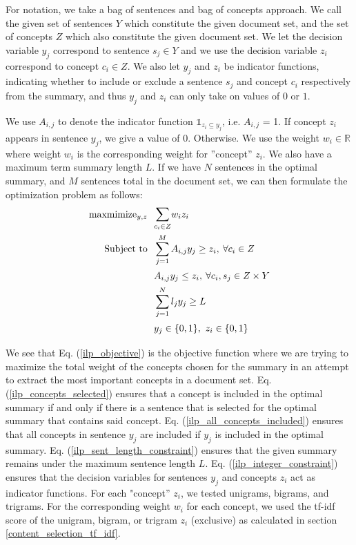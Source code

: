 For notation, we take a bag of sentences and bag of concepts approach. We call the given set of sentences $Y$ which constitute the given document set, and the set of concepts $Z$ which also constitute the given document set. We let the decision variable $y_j$ correspond to sentence $s_j\in Y$ and we use the decision variable $z_i$ correspond to concept $c_i\in Z$. We also let $y_j$ and $z_i$ be indicator functions, indicating whether to include or exclude a sentence $s_j$ and concept $c_i$ respectively from the summary, and thus $y_j$ and $z_i$ can only take on values of $0$ or $1$. 

We use $A_{i,j}$ to denote the indicator function $\mathds{1}_{z_i\subseteq y_j}$, i.e. $A_{i,j}$ = 1. If concept $z_i$ appears in sentence $y_j$, we give a value of 0. Otherwise. We use the weight $w_i\in\mathbb R$ where weight $w_i$ is the corresponding weight for ''concept'' $z_i$. We also have a maximum term summary length $L$. If we have $N$ sentences in the optimal summary, and $M$ sentences total in the document set, we can then formulate the optimization problem as follows:
\begin{align}
    \text{maxmimize}_{y,z} \ \ &\mathlarger\sum_{c_i\in Z} w_iz_i \label{ilp_objective} \\
    \text{Subject to} \ \ & \sum_{j=1}^M A_{i,j} y_j \geq z_i,\:\forall c_i\in Z  
    \label{ilp_concepts_selected} \\
    & A_{i,j}y_j \leq z_i, \: \forall c_i, s_j\in Z\times Y\label{ilp_all_concepts_included} \\
    & \sum_{j=1}^N l_jy_j \geq L \label{ilp_sent_length_constraint} \\
    & y_j\in \{0, 1\}, \ z_i\in \{0, 1\} \label{ilp_integer_constraint}
\end{align}

We see that Eq. (\ref{ilp_objective}) is the objective function where we are trying to maximize the total weight of the concepts chosen for the summary in an attempt to extract the most important concepts in a document set. 
Eq. (\ref{ilp_concepts_selected}) ensures that a concept is included in the optimal summary if and only if there is a sentence that is selected for the optimal summary that contains said concept.
Eq. (\ref{ilp_all_concepts_included}) ensures that all concepts in sentence $y_j$ are included if $y_j$ is included in the optimal summary. Eq. (\ref{ilp_sent_length_constraint}) ensures that the given summary remains under the maximum sentence length $L$. Eq. (\ref{ilp_integer_constraint}) ensures that the decision variables for sentences $y_j$ and concepts $z_i$ act as indicator functions. 
For each "concept'' $z_i$, we tested unigrams, bigrams, and trigrams. For the corresponding weight $w_i$ for each concept, we used the tf-idf score of the unigram, bigram, or trigram $z_i$ (exclusive) as calculated in section \ref{content_selection_tf_idf}.

